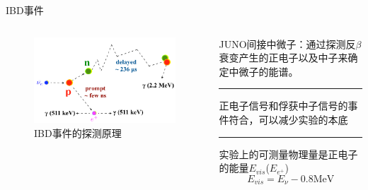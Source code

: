 \documentclass[11pt,compress,xcolor=x11names,UTF8]{beamer}
\begin{document}
\begin{frame}{IBD事件}
\begin{columns}
\begin{column}{.5\textwidth}
\begin{figure}
\centering
\includegraphics[width=\textwidth]{k_IBDevt} %
\caption{IBD事件的探测原理}
\end{figure}
\end{column}
\begin{column}{.45\textwidth}
JUNO间接中微子：通过探测反$\beta$衰变产生的正电子以及中子来确定中微子的能谱。
\vspace{.5cm}
\hrule{\textwidth}
\vspace{.5cm}

\alert{正电子信号和俘获中子信号的事件符合，可以减少实验的本底}

\vspace{.5cm}
\hrule{\textwidth}
\vspace{.5cm}
实验上的可测量物理量是正电子的能量$E_{vis}$($E_{e^+}$)
\begin{equation}
E_{vis}=E_{\nu}-0.8\text{MeV}
\end{equation}
\end{column}
\end{columns}
\end{frame}
\end{document}
